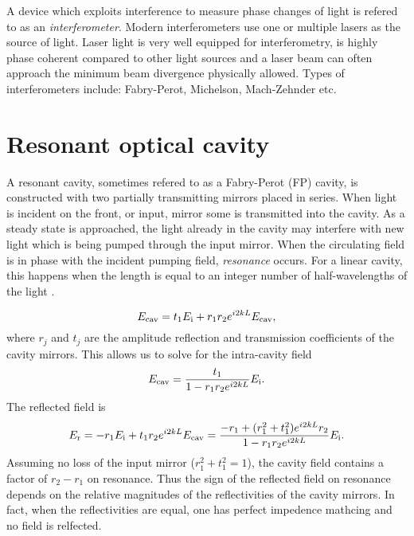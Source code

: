 A device which exploits interference to measure phase changes of light is refered to as an \emph{interferometer}. %
Modern interferometers use one or multiple lasers as the source of light. %
Laser light is very well equipped for interferometry, is highly phase coherent compared to other light sources and a laser beam can often approach the minimum beam divergence physically allowed. %
Types of interferometers include: Fabry-Perot, Michelson, Mach-Zehnder etc.

\section{Resonant optical cavity}
A resonant cavity, sometimes refered to as a Fabry-Perot (FP) cavity, is constructed with two partially transmitting mirrors placed in series. %
When light is incident on the front, or input, mirror some is transmitted into the cavity. %
As a steady state is approached, the light already in the cavity may interfere with new light which is being pumped through the input mirror. %
When the circulating field is in phase with the incident pumping field, \emph{resonance} occurs. %
For a linear cavity, this happens when the length is equal to an integer number of half-wavelengths of the light \cite{Siegman}.

\begin{equation}
E_{\rm{cav}}=t_1 E_{\rm i} + r_1 r_2 e^{i 2 k L} E_{\rm{cav}},
\end{equation}
where $r_j$ and $t_j$ are the amplitude reflection and transmission coefficients of the cavity mirrors. %
This allows us to solve for the intra-cavity field
\begin{equation}
E_{\rm{cav}}=\frac{t_1}{1 - r_1 r_2 e^{i 2 k L}} E_{\rm i}.
\end{equation}
The reflected field is
\begin{equation}
E_{\rm{r}}=-r_1 E_{\rm i} + t_1r_2 e^{i 2 k L} E_{\rm{cav}}=\frac{-r_1+(r_1^2+t_1^2)e^{i2kL}r_2}{1-r_1r_2e^{i2kL}}E_{\rm i}.
\end{equation}
Assuming no loss of the input mirror ($r_1^2+t_1^2=1$), the cavity field contains a factor of $r_2-r_1$ on resonance. %
Thus the sign of the reflected field on resonance depends on the relative magnitudes of the reflectivities of the cavity mirrors. %
In fact, when the reflectivities are equal, one has perfect impedence mathcing and no field is relfected. %


